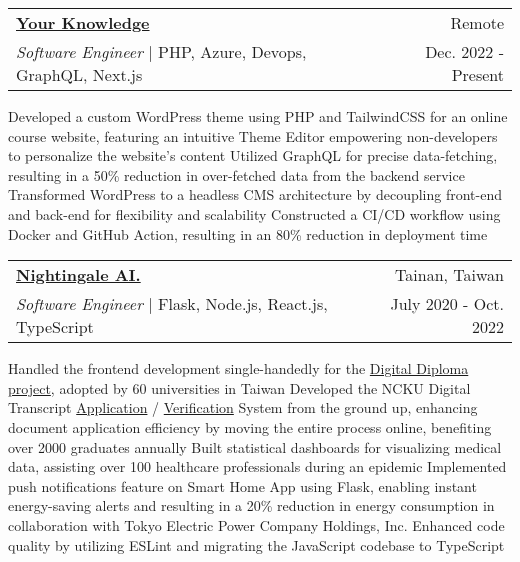 \newcommand{\resumeExpEntry}[5]{
  \vspace{5pt}\item
    \begin{tabular*}{0.97\textwidth}{l@{\extracolsep{\fill}}r}
      \textbf{#1} & \small #2 \\
      \textit{#3} | #4 & \small #5 \\
    \end{tabular*}\vspace{-5pt}
}

\resumeExpEntry
{\href{https://yourknowledge.online}{Your Knowledge}}
{Remote}
{Software Engineer}
{PHP, Azure, Devops, GraphQL, Next.js}
{Dec. 2022 - Present}
{
  \resumeItemListStart
    \resumeItem
    {Developed a custom WordPress theme using PHP and TailwindCSS for an online course website, featuring an intuitive Theme Editor empowering non-developers to personalize the website's content}
    \resumeItem
    {Utilized GraphQL for precise data-fetching, resulting in a 50\% reduction in over-fetched data from the backend service}
    \resumeItem
    {Transformed WordPress to a headless CMS architecture by decoupling front-end and back-end for flexibility and scalability}
    \resumeItem
    {Constructed a CI/CD workflow using Docker and GitHub Action, resulting in an 80\% reduction in deployment time}
  \resumeItemListEnd
}

\resumeExpEntry
{\href{https://19gale.ai}{Nightingale AI.}}
{Tainan, Taiwan}
{Software Engineer}
{Flask, Node.js, React.js, TypeScript}
{July 2020 - Oct. 2022}
{
  \resumeItemListStart
    \resumeItem
    {Handled the frontend development single-handedly for the \href{https://dcert.moe.gov.tw}{Digital Diploma project}, adopted by 60 universities in Taiwan}
    \resumeItem
    {Developed the NCKU Digital Transcript \href{https://stuapply.diploma.ncku.edu.tw/release}{Application} / \href{https://stuapply.diploma.ncku.edu.tw/verify}{Verification} System from the ground up, enhancing document application efficiency by moving the entire process online, benefiting over 2000 graduates annually}
    \resumeItem
    {Built statistical dashboards for visualizing medical data, assisting over 100 healthcare professionals during an epidemic}
    \resumeItem
    {Implemented push notifications feature on Smart Home App using Flask, enabling instant energy-saving alerts and resulting in a 20\% reduction in energy consumption in collaboration with Tokyo Electric Power Company Holdings, Inc.}
    \resumeItem
    {Enhanced code quality by utilizing ESLint and migrating the JavaScript codebase to TypeScript}
  \resumeItemListEnd
}

